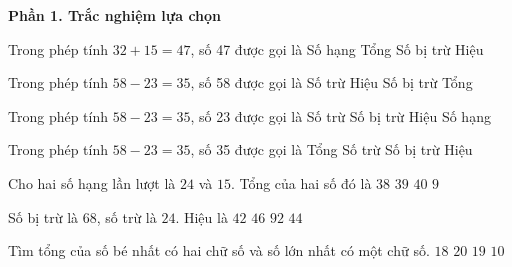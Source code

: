 \textbf{Phần 1. Trắc nghiệm lựa chọn}

\begin{ex} %
Trong phép tính $32 + 15 = 47$, số 47 được gọi là
\choice
{Số hạng}
{\True Tổng}
{Số bị trừ}
{Hiệu}
\end{ex}

\begin{ex} %
Trong phép tính $58 - 23 = 35$, số 58 được gọi là
\choice
{Số trừ}
{Hiệu}
{\True Số bị trừ}
{Tổng}
\end{ex}

\begin{ex} %
Trong phép tính $58 - 23 = 35$, số 23 được gọi là
\choice
{\True Số trừ}
{Số bị trừ}
{Hiệu}
{Số hạng}
\end{ex}

\begin{ex} %
Trong phép tính $58 - 23 = 35$, số 35 được gọi là
\choice
{Tổng}
{Số trừ}
{Số bị trừ}
{\True Hiệu}
\end{ex}

\begin{ex} %
Cho hai số hạng lần lượt là $24$ và $15$. Tổng của hai số đó là
\choice
{$38$}
{\True $39$}
{$40$}
{$9$}
\end{ex}

\begin{ex} %
Số bị trừ là $68$, số trừ là $24$. Hiệu là
\choice
{$42$}
{$46$}
{$92$}
{\True $44$}
\end{ex}

\begin{ex} %
Tìm tổng của số bé nhất có hai chữ số và số lớn nhất có một chữ số.
\choice
{$18$}
{$20$}
{\True $19$}
{$10$}
\end{ex}

